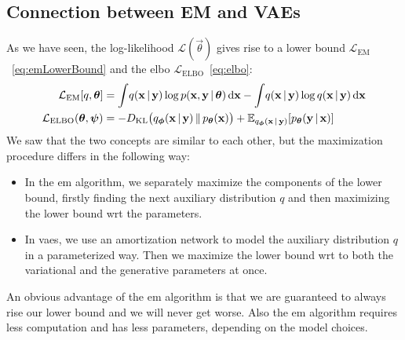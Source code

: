 	\subsection{Connection between EM and VAEs}
		As we have seen, the log-likelihood \( \mathcal{L}(\vec{\theta}) \) gives rise to a lower bound \( \mathcal{L}_\mathrm{EM} \)~\eqref{eq:emLowerBound} and the \ac{elbo} \( \mathcal{L}_\mathrm{ELBO} \)~\eqref{eq:elbo}:
		\begin{align*}
			\mathcal{L}_\mathrm{EM}[q, \boldsymbol{\mathrm{\theta}}] &= \int\! q(\boldsymbol{\mathrm{x}} \,\vert\, \boldsymbol{\mathrm{y}}) \log p(\boldsymbol{\mathrm{x}}, \boldsymbol{\mathrm{y}} \,\vert\, \boldsymbol{\mathrm{\theta}}) \dd{\boldsymbol{\mathrm{x}}} - \int\! q(\boldsymbol{\mathrm{x}} \,\vert\, \boldsymbol{\mathrm{y}}) \log q(\boldsymbol{\mathrm{x}} \,\vert\, \boldsymbol{\mathrm{y}}) \dd{\boldsymbol{\mathrm{x}}} \\
			\mathcal{L}_\mathrm{ELBO}(\boldsymbol{\mathrm{\theta}}, \boldsymbol{\mathrm{\psi}}) &= -D_\mathrm{KL}\big( q_{\boldsymbol{\mathrm{\phi}}}(\boldsymbol{\mathrm{x}} \,\vert\, \boldsymbol{\mathrm{y}}) \,\Vert\, p_{\boldsymbol{\mathrm{\theta}}}(\boldsymbol{\mathrm{x}}) \big) + \mathbb{E}_{q_{\boldsymbol{\mathrm{\phi}}}(\boldsymbol{\mathrm{x}} \,\vert\, \boldsymbol{\mathrm{y}})}[p_{\boldsymbol{\mathrm{\theta}}}(\boldsymbol{\mathrm{y}} \,\vert\, \boldsymbol{\mathrm{x}})]
		\end{align*}
		We saw that the two concepts are similar to each other, but the maximization procedure differs in the following way:
		\begin{itemize}
			\item In the \ac{em} algorithm, we separately maximize the components of the lower bound, firstly finding the next auxiliary distribution \(q\) and then maximizing the lower bound \ac{wrt} the parameters.
			\item In \acp{vae}, we use an amortization network to model the auxiliary distribution \(q\) in a parameterized way. Then we maximize the lower bound \ac{wrt} to both the variational and the generative parameters at once.
		\end{itemize}
		An obvious advantage of the \ac{em} algorithm is that we are guaranteed to always rise our lower bound and we will never get worse. Also the \ac{em} algorithm requires less computation and has less parameters, depending on the model choices.
